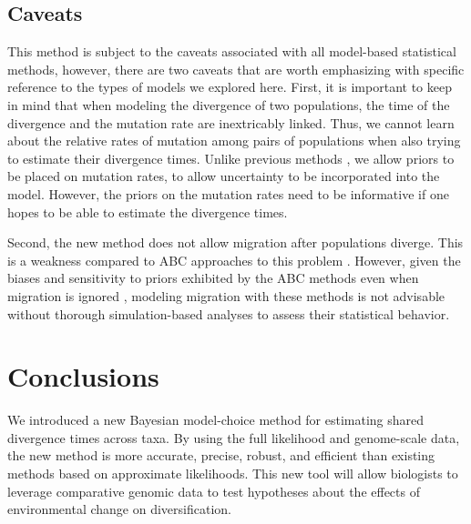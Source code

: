 \subsection{Caveats}
This method is subject to the caveats associated with all model-based
statistical methods,
however, there are two caveats that are worth emphasizing with
specific reference to the types of models we explored here.
First, it is important to keep in mind that when modeling the divergence of two
populations, the time of the divergence and the mutation rate are inextricably
linked.
Thus, we cannot learn about the relative rates of mutation among pairs of
populations when also trying to estimate their divergence times.
Unlike previous methods \citep{Hickerson2006,Huang2011,Oaks2014dpp},
we allow priors to be placed on mutation rates, to allow uncertainty
to be incorporated into the model.
However, the priors on the mutation rates need to be informative if one hopes
to be able to estimate the divergence times.

Second, the new method does not allow migration after populations diverge.
This is a weakness compared to ABC approaches to this problem
\citep{Huang2011,Oaks2014dpp}.
However, given the biases and sensitivity to priors exhibited by the ABC
methods even when migration is ignored
\citep{Oaks2012,Oaks2014reply,Oaks2014dpp},
modeling migration with these methods is not advisable without thorough
simulation-based analyses to assess their statistical behavior.

\section{Conclusions}
We introduced a new Bayesian model-choice method for estimating shared
divergence times across taxa.
By using the full likelihood and genome-scale data, the new method is more
accurate, precise, robust, and efficient than existing methods based on
approximate likelihoods.
This new tool will allow biologists to leverage comparative genomic data to
test hypotheses about the effects of environmental change on diversification.
